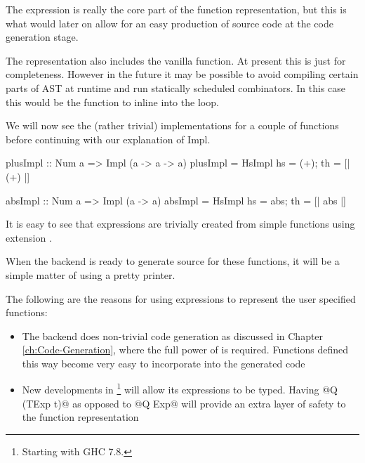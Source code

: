 \documentclass[preamble.tex]{subfiles}
\begin{document}
The  expression is really the core part of the function representation, but this is what would later on allow for an easy production of \Haskell source code at the code generation stage.

The representation also includes the vanilla \Haskell function. At present this is just for completeness. However in the future it may be possible to avoid compiling certain parts of AST at runtime and run statically scheduled combinators. In this case this would be the function to inline into the loop.

We will now see the (rather trivial) implementations for a couple of functions before continuing with our explanation of Impl.

\begin{hscode}
plusImpl :: Num a => Impl (a -> a -> a)
plusImpl = HsImpl { hs = (+); th = [| (+) |] } 

absImpl :: Num a => Impl (a -> a)
absImpl = HsImpl { hs = abs; th = [| abs |] } 
\end{hscode}

It is easy to see that  expressions are trivially created from simple \Haskell functions using  extension \cite{QQ}.

When the backend is ready to generate \Haskell source for these functions, it will be a simple matter of using a  pretty printer. 

The following are the reasons for using  expressions to represent the user specified functions:
\begin{itemize}
\item The backend does non-trivial code generation as discussed in Chapter \ref{ch:Code-Generation}, where the full power of  is required. Functions defined this way become very easy to incorporate into the generated code
\item New developments in \footnote{Starting with GHC 7.8.} will allow its expressions to be typed. Having @Q (TExp t)@ as opposed to @Q Exp@ will provide an extra layer of safety to the function representation
\end{itemize}



\end{document}
